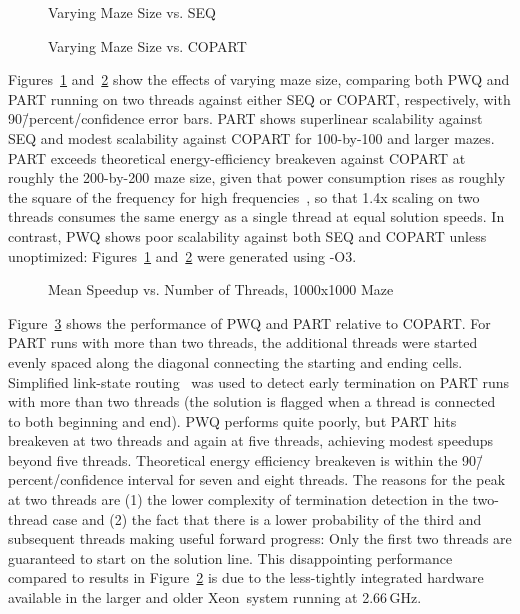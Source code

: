 \begin{figure}[tb]
\centering
{}
\caption{Varying Maze Size vs. SEQ}
\label{fig:SMPdesign:Varying Maze Size vs. SEQ}
\end{figure}

\begin{figure}[tb]
\centering
{}
\caption{Varying Maze Size vs. COPART}
\label{fig:SMPdesign:Varying Maze Size vs. COPART}
\end{figure}

Figures~\ref{fig:SMPdesign:Varying Maze Size vs. SEQ}
and~\ref{fig:SMPdesign:Varying Maze Size vs. COPART}
show the effects of varying maze size, comparing both PWQ and PART
running on two threads
against either SEQ or COPART, respectively, with 90\=/percent\-/confidence
error bars.
PART shows superlinear scalability against SEQ and modest scalability
against COPART for 100-by-100 and larger mazes.
PART exceeds theoretical energy-efficiency breakeven against COPART at roughly
the 200-by-200 maze size, given that power consumption rises as roughly
the square of the frequency for high frequencies~\cite{TrevorMudge2000Power},
so that 1.4x scaling on two threads consumes the same energy
as a single thread at equal solution speeds.
In contrast, PWQ shows poor scalability against both SEQ and COPART
unless unoptimized: Figures~\ref{fig:SMPdesign:Varying Maze Size vs. SEQ} 
and~\ref{fig:SMPdesign:Varying Maze Size vs. COPART}
were generated using -O3.

\begin{figure}[tb]
\centering
{}
\caption{Mean Speedup vs. Number of Threads, 1000x1000 Maze}
\label{fig:SMPdesign:Mean Speedup vs. Number of Threads; 1000x1000 Maze}
\end{figure}

Figure~\ref{fig:SMPdesign:Mean Speedup vs. Number of Threads; 1000x1000 Maze}
shows the performance of PWQ and PART relative to COPART.
For PART runs with more than two threads, the additional threads were
started evenly spaced along the diagonal connecting the starting and
ending cells.
Simplified link-state routing~\cite{BERT-87} was used to
detect early termination on PART runs with more than two threads
(the solution is flagged when
a thread is connected to both beginning and end).
PWQ performs quite poorly, but
PART hits breakeven at two threads and again at five threads, achieving
modest speedups beyond five threads.
Theoretical energy efficiency breakeven is within the 90\=/percent\-/confidence
interval for seven and eight threads.
The reasons for the peak at two threads are (1) the lower complexity
of termination detection in the two-thread case and (2) the fact that
there is a lower probability of the third and subsequent threads making
useful forward progress: Only the first two threads are guaranteed to start on
the solution line.
This disappointing performance compared to results in
Figure~\ref{fig:SMPdesign:Varying Maze Size vs. COPART}
is due to the less-tightly integrated hardware available in the
larger and older Xeon\mytextregistered\
system running at 2.66\,GHz.

